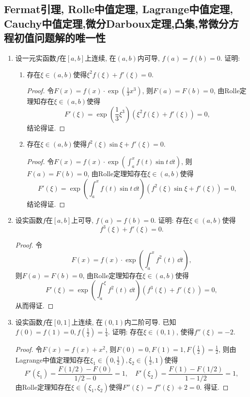 \subsection{Fermat引理, Rolle中值定理, Lagrange中值定理, Cauchy中值定理,微分Darboux定理,凸集,常微分方程初值问题解的唯一性}
\begin{1a}
\begin{enumerate}
\item 设一元实函数\(f\)在\([a,b]\)上连续, 在\((a,b)\)内可导, \(f(a)=f(b)=0\). 证明:
\begin{enumerate}[label=(\arabic*)]
\item 存在\(\xi\in(a,b)\)使得\(\xi^2f(\xi)+f'(\xi)=0\).
\begin{proof}
令\(F(x)=f(x)\cdot\exp\left(\frac{1}{3}x^3\right)\), 则\(F(a)=F(b)=0\), 
由Rolle定理知存在\(\xi\in(a,b)\)使得
\[F'(\xi)=\exp\left(\frac{1}{3}\xi^3\right)\left(\xi^2f(\xi)+f'(\xi)\right)=0,\]
结论得证.
\end{proof}
\item 存在\(\xi\in(a,b)\)使得\(f^2(\xi)\sin\xi+f'(\xi)=0\).
\begin{proof}
令\(F(x)=f(x)\cdot\exp\left(\int_a^x f(t)\sin t\,\dd t\right)\), 则\(F(a)=F(b)=0\), 
由Rolle定理知存在\(\xi\in(a,b)\)使得
\[F'(\xi)=\exp\left(\int_a^x f(t)\sin t\,\dd t\right)\left(f^2(\xi)\sin\xi+f'(\xi)\right)=0,\]
结论得证.
\end{proof}
\end{enumerate}
\item 设实函数\(f\)在\([a,b]\)上可导, \(f(a)=f(b)=0\). 
证明: 存在\(\xi\in(a,b)\)使得\[f^3(\xi)+f'(\xi)=0.\]
\begin{proof}
令\[F(x)=f(x)\cdot\exp\left(\int_a^x f^2(t)\,\dd t\right),\]
则\(F(a)=F(b)=0\), 由Rolle定理知存在\(\xi\in(a,b)\)使得
\[F'(\xi)=\exp\left(\int_a^\xi f^2(t)\,\dd t\right)\left(f^3(\xi)+f'(\xi)\right)=0,\]
从而得证.
\end{proof}
\item 设实函数\(f\)在\([0,1]\)上连续, 在\((0,1)\)内二阶可导. 
已知\(f(0)=f(1)=0,f\left(\frac{1}{2}\right)=\frac{1}{4}\). 
证明: 存在\(\xi\in(0,1)\), 使得\(f''(\xi)=-2\).
\begin{proof}
令\(F(x)=f(x)+x^2\), 则\(F(0)=0,F(1)=1,F\left(\frac{1}{2}\right)=\frac{1}{2}\), 
则由Lagrange中值定理知存在\(\xi_1\in \left(0,\frac{1}{2}\right),\xi_2\in\left(\frac{1}{2},1\right)\)使得
\[F'(\xi_1)=\frac{F\left(1/2\right)-F(0)}{1/2-0}=1,\quad F'(\xi_2)=\frac{F(1)-F\left(1/2\right)}{1-1/2}=1,\]
由Rolle定理知存在\(\xi\in(\xi_1,\xi_2)\)使得\(F''(\xi)=f''(\xi)+2=0\). 得证.
\end{proof}

\end{enumerate}
\end{1a}
